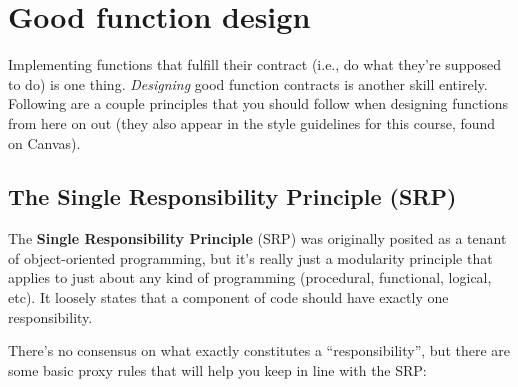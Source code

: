 \documentclass{article}
\begin{document}
\section{Good function design}

Implementing functions that fulfill their contract (i.e., do what they're supposed to do) is one thing. \textit{Designing} good function contracts is another skill entirely. Following are a couple principles that you should follow when designing functions from here on out (they also appear in the style guidelines for this course, found on Canvas).

\subsection{The Single Responsibility Principle (SRP)}

The \textbf{Single Responsibility Principle} (SRP) was originally posited as a tenant of object-oriented programming, but it's really just a modularity principle that applies to just about any kind of programming (procedural, functional, logical, etc). It loosely states that a component of code should have exactly one responsibility.

There's no consensus on what exactly constitutes a ``responsibility'', but there are some basic proxy rules that will help you keep in line with the SRP:
\end{document}
